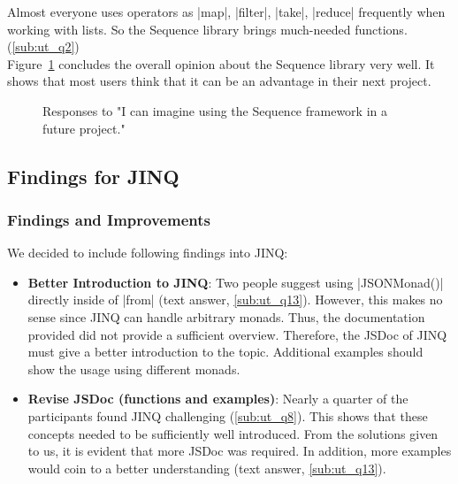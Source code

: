 Almost everyone uses operators as |map|, |filter|, |take|, |reduce|
frequently when working with lists. So the Sequence library brings much-needed
functions. (\ref{sub:ut_q2}) \\ 
Figure~\ref{fig:usertest_q1} concludes the overall opinion about the Sequence
library very well. It shows that most users think that it can be an
advantage in their next project.
\begin{figure}[H]
\caption{Responses to "I can imagine using the Sequence framework in a future project."}
\label{fig:usertest_q1}
\end{figure}
\subsection{Findings for JINQ} %
\label{sub:Findings for JINQ}
\subsubsection{Findings and Improvements} %
\label{subsub:jinq_finding_and_imrpovements}

We decided to include following findings into JINQ:
\begin{itemize}
  \item \textbf{Better Introduction to JINQ}: Two people suggest using
    |JSONMonad()| directly inside of |from| (text answer, \ref{sub:ut_q13}).
    However, this makes no sense since JINQ can handle arbitrary monads. Thus,
    the documentation provided did not provide a sufficient overview.
    Therefore, the JSDoc of JINQ must give a better introduction to the topic.
    Additional examples should show the usage using different monads.
  \item \textbf{Revise JSDoc (functions and examples)}: Nearly a quarter of the participants found JINQ
    challenging (\ref{sub:ut_q8}). This shows that these concepts needed to be
    sufficiently well introduced. From the solutions given to us, it is evident
    that more JSDoc was required. In addition, more examples would coin to a
    better understanding (text answer, \ref{sub:ut_q13}).
\end{itemize}


